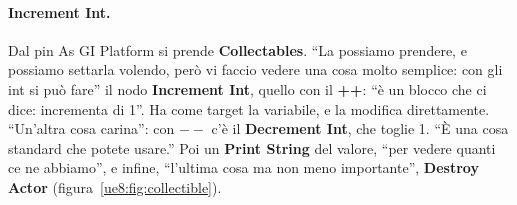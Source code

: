 \paragraph{Increment Int.} Dal pin As GI Platform si prende \textbf{Collectables}. ``La
possiamo prendere, e possiamo settarla volendo, però vi faccio vedere una cosa molto
semplice: con gli int si può fare'' il nodo \textbf{Increment Int}, quello con il
\textbf{++}: ``è un blocco che ci dice: incrementa di 1''. Ha come target la variabile,
e la modifica direttamente. ``Un'altra cosa carina'': con \textbf{$--$} c'è il
\textbf{Decrement Int}, che toglie 1. ``È una cosa standard che potete usare.'' Poi un
\textbf{Print String} del valore, ``per vedere quanti ce ne abbiamo'', e infine,
``l'ultima cosa ma non meno importante'', \textbf{Destroy Actor}
(figura~\ref{ue8:fig:collectible}).

